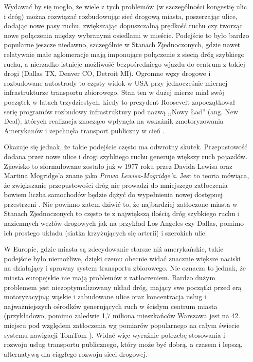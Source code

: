 \documentclass[twoside,12pt]{article}
\begin{document}
	Wydawać by się mogło, że wiele z tych problemów (w szczególności kongestię ulic i dróg) można rozwiązać rozbudowując sieć drogową miasta, poszerzając ulice, dodając nowe pasy ruchu, zwiększając dopuszczalną prędkość ruchu czy tworząc nowe połączenia między wybranymi osiedlami w mieście. Podejście to było bardzo popularne jeszcze niedawno, szczególnie w Stanach Zjednoczonych, gdzie nawet relatywnie małe aglomeracje mają imponujące połączenie z siecią dróg szybkiego ruchu, a nierzadko istnieje możliwość bezpośredniego wjazdu do centrum z takiej drogi (Dallas TX, Denver CO, Detroit MI). Ogromne węzy drogowe i rozbudowane autostrady to częsty widok w USA przy jednocześnie miernej infrastrukturze transportu zbiorowego. Stan ten w dużej mierze miał swój początek w latach trzydziestych, kiedy to prezydent Roosevelt zapoczątkował serię programów rozbudowy infrastruktury pod nazwą ,,Nowy Ład'' (ang. New Deal), których realizacja znacząco wpłynęła na wskaźnik zmotoryzowania Amerykanów i zepchnęła transport publiczny w cień \cite{makarova}.

	Okazuje się jednak, że takie podejście często ma odwrotny skutek. Przepustowość dodana przez nowe ulice i drogi szybkiego ruchu generuje większy ruch pojazdów. Zjawisko to sformułowane zostało już w 1977 roku przez Davida Lewisa oraz Martina Mogridge'a znane jako \emph{Prawo Lewisa-Mogridge'a}. Jest to teoria mówiąca, że zwiększanie przepustowości dróg nie prowadzi do mniejszego zatłoczenia bowiem liczba samochodów będzie dążyć do wypełnienia nowej dostępnej przestrzeni \cite{prawo-lewisa}. Nie powinno zatem dziwić to, że najbardziej zatłoczone miasta w Stanach Zjednoczonych to często te z największą ilością dróg szybkiego ruchu i naziemnych węzłów drogowych jak na przykład Los Angeles czy Dallas, pomimo ich prostego układu (siatka krzyżujących się arterii) i szerokich ulic.
	
	W Europie, gdzie miasta są zdecydowanie starsze niż amerykańskie, takie podejście było niemożliwe, dzięki czemu obecnie widać znacznie większe naciski na działający i sprawny system transportu zbiorowego. Nie oznacza to jednak, że miasta europejskie nie mają problemów z zatłoczeniem. Bardzo dużym problemem jest niezoptymalizowany układ dróg, mający swe początki przed erą motoryzacyjną; wąskie i zabudowane ulice oraz koncentracja usług i najważniejszych ośrodków generujących ruch w ścisłym centrum miasta (przykładowo, pomimo zaledwie 1,7 miliona mieszkańców Warszawa jest na 42. miejscu pod względem zatłoczenia wg pomiarów popularnego na całym świecie systemu nawigacji TomTom \cite{tomtom}). Widać więc wyraźnie potrzebę stosowania i rozwoju usług transportu publicznego, który może być dobrą, a czasem i lepszą, alternatywą dla ciągłego rozwoju sieci drogowej. 
	
\end{document}
